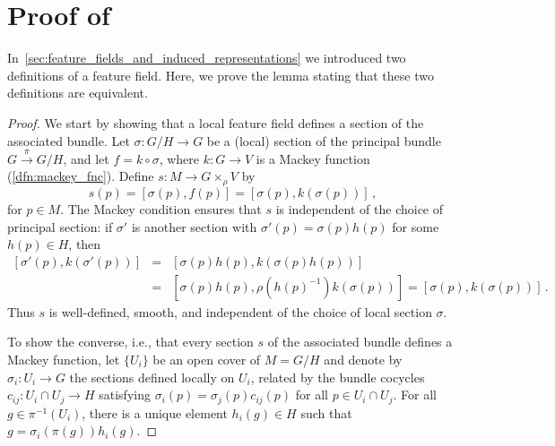 \documentclass[12pt,a4paper]{article}
\numberwithin{equation}{section}
\theoremstyle{plain}
\theoremstyle{definition}
\theoremstyle{remark}
\begin{document}
\section{Proof of }\label{app:proof_of_equiv_feat_fields}
In~\cref{sec:feature_fields_and_induced_representations} we introduced two definitions of a feature field. Here, we prove the lemma stating that these two definitions are equivalent.
\MackeyLemma*
\begin{proof}
    We start by showing that a local feature field defines a section of the associated bundle. Let $\sigma:G/H\to G$ be a (local) section of the principal bundle $G\overset{\pi}{\to}G/H$, and let $f=k\circ\sigma$, where $k:G\to V$ is a Mackey function (\cref{dfn:mackey_fnc}). Define $s:M \to G\times_\rho V$ by
    \begin{equation}
        s(p) = \left[\sigma(p),f(p)\right] = \left[\sigma(p),k(\sigma(p))\right]\,,
    \end{equation}
    for $p\in M$. The Mackey condition ensures that $s$ is independent of the choice of principal section: if $\sigma'$ is another section with $\sigma'(p) = \sigma(p)h(p)$ for some $h(p)\in H$, then
    \begin{eqnarray*}
        \left[\sigma'(p),k(\sigma'(p))\right] &=& \left[\sigma(p)h(p),k(\sigma(p)h(p))\right] \\
        &=& \left[\sigma(p)h(p),\rho(h(p)^{-1})k(\sigma(p))\right] = \left[\sigma(p),k(\sigma(p))\right]\,.
    \end{eqnarray*}
    Thus $s$ is well-defined, smooth, and independent of the choice of local section $\sigma$.
    
    To show the converse, i.e., that every section $s$ of the associated bundle defines a Mackey function, let $\{U_i\}$ be an open cover of $M=G/H$ and denote by $\sigma_i:U_i\to G$ the sections defined locally on $U_i$, related by the bundle cocycles $c_{ij}:U_i\cap U_j\to H$ satisfying $\sigma_i(p)=\sigma_j(p)c_{ij}(p)$ for all $p\in U_i\cap U_j$. For all $g\in\pi^{-1}(U_i)$, there is a unique element $h_i(g)\in H$ such that $g=\sigma_i(\pi(g))h_i(g)$.


\end{proof}
\end{document}

